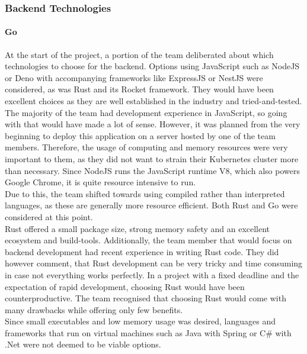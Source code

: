 \subsubsection{Backend Technologies}
\paragraph{Go}
At the start of the project, a portion of the team deliberated about which technologies to choose for the backend.
Options using JavaScript such as NodeJS or Deno with accompanying frameworks like ExpressJS or NestJS were considered, as was Rust and its Rocket framework.
They would have been excellent choices as they are well established in the industry and tried-and-tested.\\

\noindent
The majority of the team had development experience in JavaScript, so going with that would have made a lot of sense.
However, it was planned from the very beginning to deploy this application on a server hosted by one of the team members.
Therefore, the usage of computing and memory resources were very important to them, as they did not want to strain their Kubernetes cluster more than necessary.
Since NodeJS runs the JavaScript runtime V8, which also powers Google Chrome, it is quite resource intensive to run.\\

\noindent
Due to this, the team shifted towards using compiled rather than interpreted languages, as these are generally more resource efficient.
Both Rust and Go were considered at this point.\\

\noindent
Rust offered a small package size, strong memory safety and an excellent ecosystem and build-tools.
Additionally, the team member that would focus on backend development had recent experience in writing Rust code.
They did however comment, that Rust development can be very tricky and time consuming in case not everything works perfectly.
In a project with a fixed deadline and the expectation of rapid development, choosing Rust would have been counterproductive.
The team recognised that choosing Rust would come with many drawbacks while offering only few benefits.\\

\noindent
Since small executables and low memory usage was desired, languages and frameworks that run on virtual machines such as Java with Spring or C\# with .Net were not deemed to be viable options.\\

